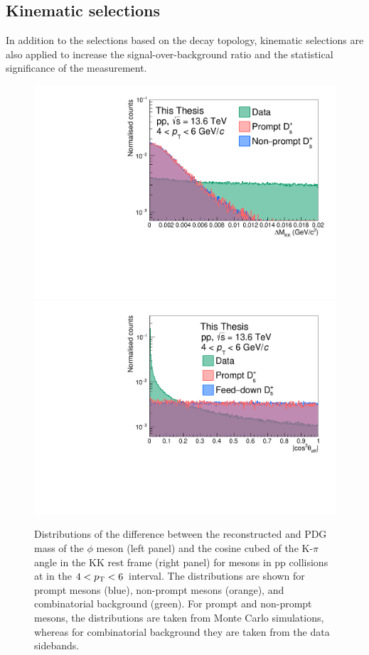 \subsection{Kinematic selections}
In addition to the selections based on the decay topology, kinematic selections are also applied to increase the signal-over-background ratio and the statistical significance of the measurement.
\begin{figure}[tb]
    \centering
    \includegraphics[width=0.48\linewidth]{Figures/Chapter 4/DeltaMassKK.pdf}
    \includegraphics[width=0.48\linewidth]{Figures/Chapter 4/AbsCos3PiK.pdf}
    \caption{Distributions of the difference between the reconstructed and PDG mass of the $\phi$ meson (left panel) and the cosine cubed of the K-$\pi$ angle in the KK rest frame (right panel) for \ds mesons in pp collisions at \thirteen in the $4 < p_\mathrm{T} < 6$~\gevc interval. The distributions are shown for prompt \ds mesons (blue), non-prompt \ds mesons (orange), and combinatorial background (green). For prompt and non-prompt \ds mesons, the distributions are taken from Monte Carlo simulations, whereas for combinatorial background they are taken from the data sidebands.}
    \label{fig:DeltaMassPhi}
\end{figure}

